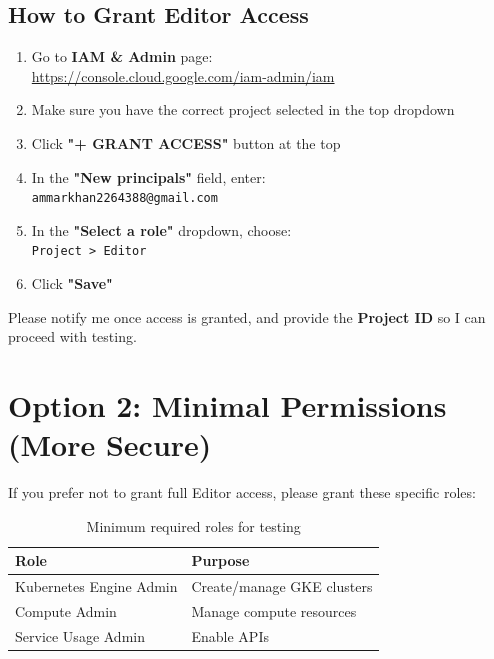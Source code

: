 \documentclass[11pt,a4paper]{article}
\begin{document}
\subsection{How to Grant Editor Access}

\begin{enumerate}
    \item Go to \textbf{IAM \& Admin} page:\\
    \url{https://console.cloud.google.com/iam-admin/iam}
    
    \item Make sure you have the correct project selected in the top dropdown
    
    \item Click \textbf{"+ GRANT ACCESS"} button at the top
    
    \item In the \textbf{"New principals"} field, enter:\\
    \texttt{ammarkhan2264388@gmail.com}
    
    \item In the \textbf{"Select a role"} dropdown, choose:\\
    \texttt{Project > Editor}
    
    \item Click \textbf{"Save"}
\end{enumerate}

\begin{tcolorbox}[colback=backcolour,colframe=green!50!black,title=\textbf{After Granting Access}]
Please notify me once access is granted, and provide the \textbf{Project ID} so I can proceed with testing.
\end{tcolorbox}

\section{Option 2: Minimal Permissions (More Secure)}

If you prefer not to grant full Editor access, please grant these specific roles:

\begin{table}[h]
\centering
\begin{tabular}{@{}ll@{}}
\toprule
\textbf{Role} & \textbf{Purpose} \\
\midrule
Kubernetes Engine Admin & Create/manage GKE clusters \\
Compute Admin & Manage compute resources \\
Service Usage Admin & Enable APIs \\
\bottomrule
\end{tabular}
\caption{Minimum required roles for testing}
\end{table}
\end{document}
